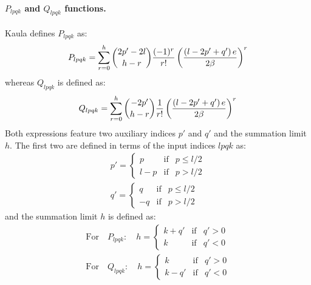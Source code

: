 			\paragraph{$P_{lpqk}$ and $Q_{lpqk}$ functions.\\}
			\indent Kaula defines $P_{lpqk}$ as:
			\begin{equation}
			P_{lpqk} = \displaystyle\sum_{r = 0}^h  \dbinom{ 2 p' - 2 l} {h - r} \dfrac{(-1)^r}{r!} \left( \dfrac{\left(l - 2p' + q'\right) e}{2\beta}\right)^r
			\label{eq:P_lpqk_Kaula}
			\end{equation}
			\noindent whereas $Q_{lpqk}$ is defined as:
			\begin{equation}
			Q_{lpqk} = \displaystyle\sum_{r = 0}^h  \dbinom{- 2 p'} {h - r} \dfrac{1}{r!} \left( \dfrac{\left(l - 2p' + q'\right) e}{2\beta}\right)^r
			\label{eq:Q_lpqk_Kaula}
			\end{equation}
			\indent Both expressions feature two auxiliary indices $p'$ and $q'$ and the summation limit $h$. The first two are defined in terms of the input indices $lpqk$ as:
			\begin{align}
			\label{eq:pprime} p' = \left\{
			\begin{array}{ccc}
			p & \text{if} & p \leq l/2 \\
			l - p & \text{if} & p > l/2
			\end{array}
			\right.
			\\
			\label{eq:qprime} q' =  \left\{
			\begin{array}{ccc}
			q & \text{if} & p \leq l/2 \\
			-q & \text{if} & p > l/2
			\end{array}
			\right.
			\end{align}
			\noindent and the summation limit $h$ is defined as:
			\begin{align}
			\label{eq:h_P} \text{For}\quad P_{lpqk}: \quad h =  \left\{
			\begin{array}{ccc}
			k + q' & \text{if} & q' >0 \\
			k & \text{if} & q' < 0
			\end{array}
			\right.
			\\
			\label{eq:h_Q} \text{For}\quad Q_{lpqk}: \quad h =  \left\{
			\begin{array}{ccc}
			k  		& \text{if} & q' > 0 \\
			k - q' 	& \text{if} & q' < 0
			\end{array}
			\right.
			\end{align}
